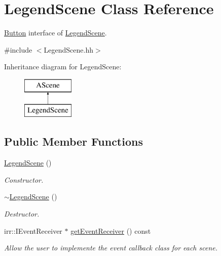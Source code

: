 \hypertarget{classLegendScene}{}\section{Legend\+Scene Class Reference}
\label{classLegendScene}


\hyperlink{classButton}{Button} interface of \hyperlink{classLegendScene}{Legend\+Scene}.  




{\ttfamily \#include $<$Legend\+Scene.\+hh$>$}

Inheritance diagram for Legend\+Scene\+:\begin{figure}[H]
\begin{center}
\leavevmode
\includegraphics[height=2.000000cm]{classLegendScene}
\end{center}
\end{figure}
\subsection*{Public Member Functions}
\begin{DoxyCompactItemize}
\item 
\hyperlink{classLegendScene_a33a4d96e0e320724e60d565dec448e38}{Legend\+Scene} ()
\begin{DoxyCompactList}\small\item\em Constructor. \end{DoxyCompactList}\item 
\hyperlink{classLegendScene_a88e66f9964236616735c7b9873641141}{$\sim$\+Legend\+Scene} ()
\begin{DoxyCompactList}\small\item\em Destructor. \end{DoxyCompactList}\item 
irr\+::\+I\+Event\+Receiver $\ast$ \hyperlink{classLegendScene_ab11340ae844c04d704f28e1ef188deae}{get\+Event\+Receiver} () const
\begin{DoxyCompactList}\small\item\em Allow the user to implemente the event callback class for each scene. \end{DoxyCompactList}\end{DoxyCompactItemize}


